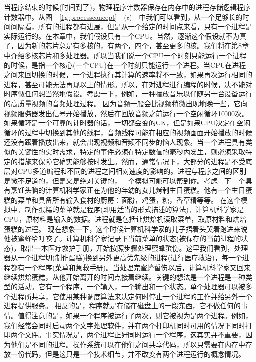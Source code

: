 	当程序结束的时候(时间到了)，物理程序计数器保存在内存中的进程存储逻辑程序计数器中。从图　\ref{fig:processconcept}　(c)　中我们可以看到，从一个足够长的时间间隔看，所有的进程都有进展，但是从一个给定的时间点来看，只有一个进程是实际运行的。在本章中，我们假设只有一个CPU。当然，逐渐这个假设就不为真了，因为新的芯片总是有多核的，有两个，四个，甚至更多的核。我们将在第8章中介绍多核芯片和多处理器。所以当我们说一个CPU一个时刻只能运行一个进程的时候，是指一个核心(一个CPU)在一个时刻只能运行一个进程。当CPU在进程之间来回切换的时候，一个进程执行其计算的速率将不一致，如果再次运行相同的进程，甚至可能无法再现以上的情形。所以，在对进程进行编程的时候，决不能对时序做任何想当然地假设。考虑一下，例如，一种播放音乐以伴随另一台设备运行的高质量视频的音频处理过程。
	因为音频一般会比视频稍微出现地晚一些，它向视频服务器发出信号开始播放，然后在回放音频之前运行一个空闲循环10000次。如果循环是一个可靠的计时器的话，一切都会变的OK，但是如果CPU决定在空闲循环的过程中切换到其他的线程，音频线程可能在相应的视频画面开始播放的时候还没有跟着播放出来，就会出现视频和音频不同步的恼人现象。当一个进程具有类似的关键性的实时需求，特定的事件必须在特定数值的毫秒内发生，则必须采取特定的措施来保障它确实能够按时发生。然而，通常情况下，大部分的进程是不受底层对CPU多道编程和不同的进程之间相对速度的影响的。进程与程序之间的区别是微不足道的，但是又是绝对关键的，一个模拟可能可以帮到你。考虑一下一个具有烹饪头脑的计算机科学家正在为他的年幼的女儿烤制生日蛋糕。他有一个生日蛋糕的菜单和具备所有输入食材的厨房：面粉，鸡蛋，糖，香草精等等。
	在这个模拟中，制作蛋糕的菜单就是程序(即用适当的形式描述的算法)，计算机科学家是CPU，原材料是输入的数据。进程就是包括让烘焙机读取菜单，取原材料和烘焙蛋糕的过程。
	现在想象一下，这个时候计算机科学家的儿子捂着头哭着跑进来说他被蜜蜂给叮咬了。计算机科学家记录下当前菜单的状态(被保存的当前进程的状态)，取出一本医疗救护手册，开始按照步骤处理蜜蜂蜇伤。这里我们看到，处理器从一个进程切(制作蛋糕)换到另外更高优先级的进程(进行医疗救治)，每一个进程都有一个程序(菜单和急救手册)。当处理完蜜蜂蜇伤以后，计算机科学家又回来继续烘焙蛋糕，从他开始离开的时间点接着继续。关键的想法是一个进程是一种类型的活动。它有一个程序，一个输入，一个输出和一个状态。单个处理器可以被多个进程所共享，它使用某种调度算法来决定何时停止一个进程的工作并给另外一个进程提供服务。
	相反的是，程序就是存储在磁盘上的一段东西，它不做任何的事情。值得注意的是，如果一个程序被运行了两次，则它被视为是两个进程。例如，我们经常会同时启动两个文字处理软件，并在两个打印机同时可用的情况下同时打印两个文件。事实情况是，两个进程正好同时运行一个程序，这其实并不重要，因为他们是不同的进程。操作系统可以在他们之间共享代码，所以只需要在内存中存放一份代码，但是这只是一个技术细节，并不改变有两个进程运行的概念情况。
	
